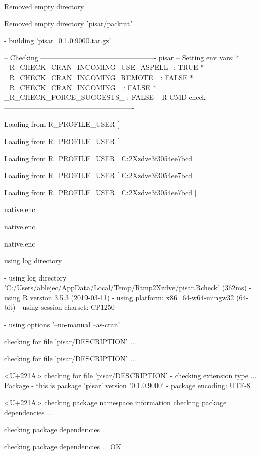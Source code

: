 \documentclass[a4paper,12pt]{article}\usepackage[]{graphicx}\usepackage[]{color}
\begin{document}
\begin{Schunk}
\begin{Soutput}
  
Removed empty directory 
  
   Removed empty directory 'pisar/packrat'

  
  
  
-  building 'pisar_0.1.0.9000.tar.gz'

  
   

-- Checking ------------------------------------------------- pisar --
Setting env vars:
* _R_CHECK_CRAN_INCOMING_USE_ASPELL_: TRUE
* _R_CHECK_CRAN_INCOMING_REMOTE_    : FALSE
* _R_CHECK_CRAN_INCOMING_           : FALSE
* _R_CHECK_FORCE_SUGGESTS_          : FALSE
-- R CMD check -------------------------------------------------------
  
Loading from R_PROFILE_USER [
  
Loading from R_PROFILE_USER [ 
  
Loading from R_PROFILE_USER [ C:\Users\ablejec\AppData\Local\Temp\Rtmp2Xzdve\file3f3054ee7bcd
  
Loading from R_PROFILE_USER [ C:\Users\ablejec\AppData\Local\Temp\Rtmp2Xzdve\file3f3054ee7bcd 
  
   Loading from R_PROFILE_USER [ C:\Users\ablejec\AppData\Local\Temp\Rtmp2Xzdve\file3f3054ee7bcd ]

  
native.enc
  
native.enc 
  
   native.enc 

  
  
  
   using log directory 
  
-  using log directory 'C:/Users/ablejec/AppData/Local/Temp/Rtmp2Xzdve/pisar.Rcheck' (362ms)
-  using R version 3.5.3 (2019-03-11)
-  using platform: x86_64-w64-mingw32 (64-bit)
-  using session charset: CP1250

  
  
  
-  using options '--no-manual --as-cran'

  
   checking for file 'pisar/DESCRIPTION' ...
  
   checking for file 'pisar/DESCRIPTION' ... 
  
<U+221A>  checking for file 'pisar/DESCRIPTION'
-  checking extension type ... Package
-  this is package 'pisar' version '0.1.0.9000'
-  package encoding: UTF-8

  
<U+221A>  checking package namespace information
   checking package dependencies ...
  
   checking package dependencies ... 
  
   checking package dependencies ... OK
  

\end{Soutput}
\end{Schunk}
\end{document}
